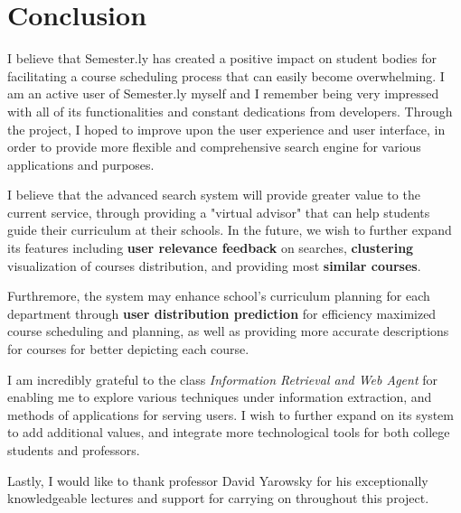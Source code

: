 \documentclass[twoside]{article}
\begin{document}
\section{Conclusion}
I believe that Semester.ly has created a positive impact on student bodies for facilitating a course scheduling process that can easily become overwhelming. I am an active user of Semester.ly myself and I remember being very impressed with all of its functionalities and constant dedications from developers. Through the project, I hoped to improve upon the user experience and user interface, in order to provide more flexible and comprehensive search engine for various applications and purposes.

I believe that the advanced search system will provide greater value to the current service, through providing a "virtual advisor" that can help students guide their curriculum at their schools. In the future, we wish to further expand its features including \textbf{user relevance feedback} on searches, \textbf{clustering} visualization of courses distribution, and providing most \textbf{similar courses}.

Furthremore, the system may enhance school's curriculum planning for each department through \textbf{user distribution prediction} for efficiency maximized course scheduling and planning, as well as providing more accurate descriptions for courses for better depicting each course.

I am incredibly grateful to the class \textit{Information Retrieval and Web Agent} for enabling me to explore various techniques under information extraction, and methods of applications for serving users. I wish to further expand on its system to add additional values, and integrate more technological tools for both college students and professors.

Lastly, I would like to thank professor David Yarowsky for his exceptionally knowledgeable lectures and support for carrying on throughout this project.
\end{document}
